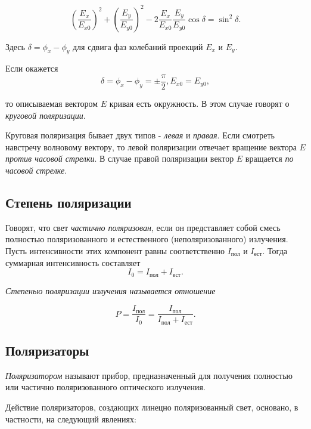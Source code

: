 \begin{equation*}
    \left(\frac{E_x}{E_{x0}}\right)^2+\left(\frac{E_y}{E_{y0}}\right)^2 - 2\frac{E_x}{E_{x0}}\frac{E_y}{E_{y0}}\cos\delta = \sin^2\delta.
\end{equation*}

Здесь $\delta = \phi_x -\phi_y$ для сдвига фаз колебаний проекций $E_x$ и $E_y$.

Если окажется
\begin{equation*}
    \delta = \phi_x - \phi_y = \pm \frac{\pi}{2}, E_{x0} = E_{y0},
\end{equation*}

то описываемая вектором $E$ кривая есть окружность. В этом случае говорят о \textit{круговой поляризации}.

Круговая поляризация бывает двух типов - \textit{левая} и \textit{правая}. Если смотреть навстречу волновому вектору, то левой поляризации отвечает вращение вектора $E$ \textit{против часовой стрелки}. В случае правой поляризации вектор $E$ вращается \textit{по часовой стрелке}.
\subsection{Степень поляризации}

Говорят, что свет \textit{частично поляризован}, если он представляет собой смесь полностью поляризованного и естественного (неполяризованного) излучения. Пусть интенсивности этих компонент равны соответственно $I_{\text{пол}}$ и   $I_{\text{ест}}$. Тогда суммарная интенсивность составляет 
\begin{equation*}
    I_0 = I_{\text{пол}}+I_{\text{ест}}.
\end{equation*}

\textit{Степенью поляризации излучения называется отношение}


\begin{equation*}
    P = \frac{I_{\text{пол}}}{I_0} = \frac{I_{\text{пол}}}{I_{\text{пол}}+I_{\text{ест}}}.
\end{equation*}
\subsection{Поляризаторы}

\textit{Поляризатором} называют прибор, предназначенный для получения полностью или частично поляризованного оптического излучения.

Действие поляризаторов, создающих линецно поляризованный свет, основано, в частности, на следующий явлениях:

